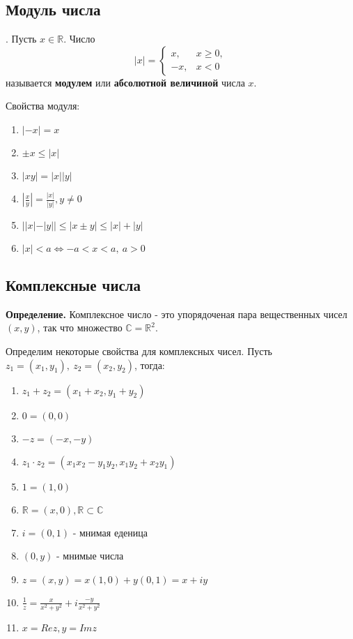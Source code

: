 \documentclass{article}
\begin{document}
\subsection{Модуль числа}
{.} Пусть $x \in \mathbb{R}$. Число
\begin{equation*}
	|x| = \begin{cases}
		x, & x \geq 0, \\
		-x, & x < 0
	\end{cases}
\end{equation*}
называется {\bf модулем} или {\bf абсолютной величиной} числа $x$. 

\noindent Свойства модуля:
\begin{enumerate}
	\item $|-x| = x$
	\item $\pm x \leq |x|$
	\item $|xy| = |x||y|$
	\item $\displaystyle|\frac{x}{y}| = \displaystyle\frac{|x|}{|y|}, y \neq 0$
	\item $\displaystyle||x| - |y|| \leq |x \pm y| \leq |x| + |y|$
	\item $|x| < a \Leftrightarrow -a < x < a,\ a > 0$
\end{enumerate}

\subsection{Комплексные числа}

{\bf Определение.} Комплексное число - это упорядоченая пара вещественных чисел $(x, y)$, так что множество $\mathbb{C} = \mathbb{R}^2$.

Определим некоторые свойства для комплексных чисел. Пусть $z_1 = (x_1, y_1),\ z_2 = (x_2, y_2)$, тогда:
\begin{enumerate}
	\item $z_1 + z_2 = (x_1 + x_2, y_1 + y_2)$
	\item $0 = (0, 0)$
	\item $-z = (-x, -y)$
	\item $z_1 \cdot z_2 = (x_1x_2 - y_1y_2, x_1y_2 + x_2y_1)$
	\item $1 = (1, 0)$
	\item $\mathbb{R} = (x, 0), \mathbb{R} \subset \mathbb{C}$
	\item $i = (0, 1)$ - мнимая еденица
	\item $(0, y)$ - мнимые числа
	\item $z = (x, y) = x(1, 0) + y(0, 1) = x + iy$
	\item $\displaystyle\frac{1}{z} = \displaystyle\frac{x}{x^2 + y^2} + i\displaystyle\frac{-y}{x^2 + y^2}$
	\item $x = Rez, y = Imz$
\end{enumerate}
\end{document}
